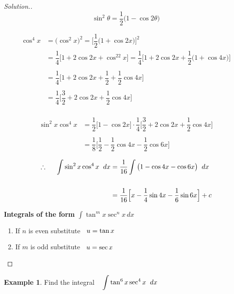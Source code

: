 \documentclass[11pt,a4paper]{article}
\theoremstyle{definition}
\newtheorem{exa}[thm]{Example}
\newenvironment{solution}
  {\renewcommand{\qedsymbol}{}\begin{proof}[\textit{Solution}.]}
  {\end{proof}}
\newcommand{\subhead}[1]{%
  \par\medskip\noindent\textbf{#1}\par\nobreak\smallskip}
\begin{document}
\begin{solution}
$$\sin^2\theta  = \dfrac{1}{2}\big(1 - \cos 2\theta\big)$$

\begin{align*}
\cos^4x & = \big(\cos^2x\big)^2 = \Big[\dfrac{1}{2}\big(1 + \cos 2x\big)\Big]^2\\
& = \dfrac{1}{4}\Big[1 + 2\cos 2x + \cos^22x\Big] = \dfrac{1}{4}\Big[1 + 2\cos 2x + \dfrac{1}{2}\big(1 + \cos 4x\big)\Big]\\\\
& = \dfrac{1}{4}\Big[1 + 2\cos 2x + \dfrac{1}{2} + \dfrac{1}{2}\cos 4x\Big]\\\\
& = \dfrac{1}{4}\Big[\dfrac{3}{2} + 2\cos 2x + \dfrac{1}{2}\cos 4x\Big]\\
\end{align*}

\begin{align*}
\sin^2x\cos^4x & = \dfrac{1}{2}\Big[1 - \cos 2x\Big]\cdot \dfrac{1}{4}\Big[\dfrac{3}{2} + 2\cos 2x + \dfrac{1}{2}\cos 4x\Big]\\\\
& = \dfrac{1}{8}\Big[\dfrac{1}{2}- \dfrac{1}{2}\cos 4x - \dfrac{1}{2}\cos 6x\Big]
\end{align*}

\begin{align*}
\therefore\hspace{0.5cm} \int \sin^2x\cos^4x\hspace{0.2cm}dx & = \dfrac{1}{16}\int \big(1 - \cos 4x - \cos 6x\big)\hspace{0.2cm}dx\\\\
& = \dfrac{1}{16}\Big[x - \dfrac{1}{4}\sin 4x - \dfrac{1}{6}\sin 6x\Big] + c\\
\end{align*}

\subhead{Integrals of the form $\int \tan^m x\sec^n x\,dx$}
\begin{enumerate}
     \item[] If $n$ is even substitute $\hspace{0.2cm} u = \tan x$
     \item[] If $m$ is odd substitute $\hspace{0.2cm}  u = \sec x$
\end{enumerate}
\end{solution}

\begin{exa}
Find the integral $\hspace{0.3cm}\displaystyle{\int \tan^6x\sec^4x\hspace{0.2cm} dx}$
\end{exa}
\end{document}

